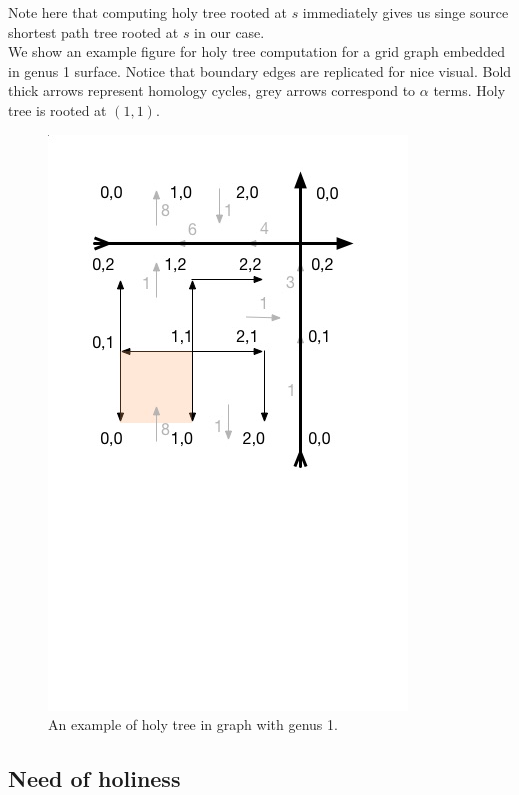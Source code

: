 \documentclass{article}
\begin{document}
Note here that computing holy tree rooted at $s$ immediately gives us singe
source shortest path tree rooted at $s$ in our case. \\

We show an example figure for holy tree computation for a grid graph 
embedded in genus 1 surface. Notice that boundary edges are replicated for nice 
visual. Bold thick arrows represent homology cycles, grey arrows correspond to 
$\alpha$ terms. Holy tree is rooted at $(1, 1)$. 

\begin{figure}
  \label{fig: g1}
  \centering
  \includegraphics[scale = 0.5]{figures/g1.jpg}
  \vspace{-3.5cm} %
  \caption{An example of holy tree in graph with genus 1.}
\end{figure}

\subsection{Need of holiness}
\end{document}
